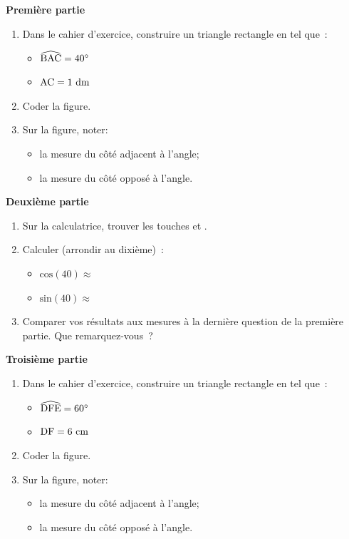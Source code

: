 \documentclass[activite]{thedocument}
\begin{document}
{\bfseries\centering Première partie\par}\noindent
\begin{enumerate}
    \item Dans le cahier d'exercice, construire un triangle 
    rectangle en  tel que~:
    \begin{itemize}
        \item $\widehat{\text{BAC}}=40^\circ$
        \item $\text{AC} = 1 \text{ dm}$
    \end{itemize}
    \item Coder la figure.
    \item Sur la figure, noter:
    \begin{itemize}
        \item la mesure du côté adjacent à l'angle;
        \item la mesure du côté opposé à l'angle.
    \end{itemize}
\end{enumerate}
{\bfseries\centering Deuxième partie\par}\noindent
\begin{enumerate}
    \item Sur la calculatrice, trouver les touches 
    et .
    \item Calculer (arrondir au dixième)~:
    \begin{itemize}
        \item $\text{cos}(40)\approx$
        \item $\text{sin}(40)\approx$
    \end{itemize}
    \item Comparer vos résultats aux mesures à la dernière question de la
    première partie. Que remarquez-vous~?
    \answerspace{5cm}
\end{enumerate}
\newpage
{\bfseries\centering Troisième partie\par}\noindent
\begin{enumerate}
    \item Dans le cahier d'exercice, construire un triangle 
    rectangle en  tel que~:
    \begin{itemize}
        \item $\widehat{\text{DFE}}=60^\circ$
        \item $\text{DF} = 6 \text{ cm}$
    \end{itemize}
    \item Coder la figure.
    \item Sur la figure, noter:
    \begin{itemize}
        \item la mesure du côté adjacent à l'angle;
        \item la mesure du côté opposé à l'angle.
    \end{itemize}
\end{enumerate}
\end{document}
